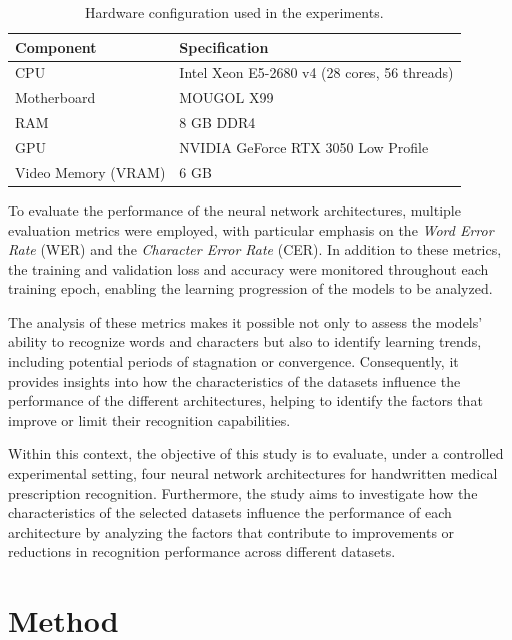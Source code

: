 \documentclass[11pt,a4paper]{article}
\begin{document}
\begin{table}[H]
	\centering
	\caption{Hardware configuration used in the experiments.}
	\label{tab:hardware}
	\begin{tabular}{ll}
		\hline
		\textbf{Component} & \textbf{Specification} \\ \hline
		CPU & Intel Xeon E5-2680 v4 (28 cores, 56 threads) \\
		Motherboard & MOUGOL X99 \\
		RAM & 8 GB DDR4 \\
		GPU & NVIDIA GeForce RTX 3050 Low Profile \\
		Video Memory (VRAM) & 6 GB \\ \hline
	\end{tabular}
\end{table}



To evaluate the performance of the neural network architectures, multiple evaluation metrics were employed, with particular emphasis on the \textit{Word Error Rate} (WER) and the \textit{Character Error Rate} (CER). In addition to these metrics, the training and validation loss and accuracy were monitored throughout each training epoch, enabling the learning progression of the models to be analyzed.

The analysis of these metrics makes it possible not only to assess the models' ability to recognize words and characters but also to identify learning trends, including potential periods of stagnation or convergence. Consequently, it provides insights into how the characteristics of the datasets influence the performance of the different architectures, helping to identify the factors that improve or limit their recognition capabilities.

Within this context, the objective of this study is to evaluate, under a controlled experimental setting, four neural network architectures for handwritten medical prescription recognition. Furthermore, the study aims to investigate how the characteristics of the selected datasets influence the performance of each architecture by analyzing the factors that contribute to improvements or reductions in recognition performance across different datasets.



\section{Method}
\label{sec:method}
\end{document}
